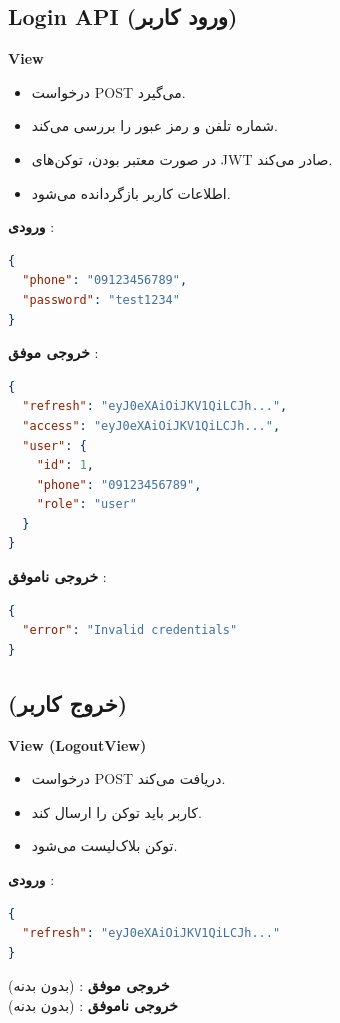 \documentclass{report}
\begin{document}
\subsection{Login API (ورود کاربر)}
\textbf{View } \\
\begin{itemize}
  \item درخواست POST می‌گیرد.
  \item شماره تلفن و رمز عبور را بررسی می‌کند.
  \item در صورت معتبر بودن، توکن‌های JWT صادر می‌کند.
  \item اطلاعات کاربر بازگردانده می‌شود.
\end{itemize}

\textbf{ورودی }:
\begin{lstlisting}[language=json]
{
  "phone": "09123456789",
  "password": "test1234"
}
\end{lstlisting}

\textbf{خروجی موفق }:
\begin{lstlisting}[language=json]
{
  "refresh": "eyJ0eXAiOiJKV1QiLCJh...",
  "access": "eyJ0eXAiOiJKV1QiLCJh...",
  "user": {
    "id": 1,
    "phone": "09123456789",
    "role": "user"
  }
}
\end{lstlisting}

\textbf{خروجی ناموفق }:
\begin{lstlisting}[language=json]
{
  "error": "Invalid credentials"
}
\end{lstlisting}


\subsection{ (خروج کاربر)}
\textbf{View (LogoutView)} \\
\begin{itemize}
  \item درخواست POST دریافت می‌کند.
  \item کاربر باید توکن  را ارسال کند.
  \item توکن بلاک‌لیست می‌شود.
\end{itemize}

\textbf{ورودی }:
\begin{lstlisting}[language=json]
{
  "refresh": "eyJ0eXAiOiJKV1QiLCJh..."
}
\end{lstlisting}

\textbf{خروجی موفق }: (بدون بدنه) \\
\textbf{خروجی ناموفق }: (بدون بدنه)
\end{document}
